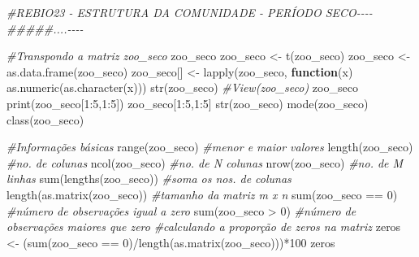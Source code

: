 \documentclass[
  letterpaper,
  DIV=11,
  numbers=noendperiod]{scrartcl}
\newenvironment{Shaded}{}{}
\newcommand{\CommentTok}[1]{\textcolor[rgb]{0.38,0.63,0.69}{\textit{#1}}}
\newcommand{\ControlFlowTok}[1]{\textcolor[rgb]{0.00,0.44,0.13}{\textbf{#1}}}
\newcommand{\DecValTok}[1]{\textcolor[rgb]{0.25,0.63,0.44}{#1}}
\newcommand{\DocumentationTok}[1]{\textcolor[rgb]{0.73,0.13,0.13}{\textit{#1}}}
\newcommand{\FunctionTok}[1]{\textcolor[rgb]{0.02,0.16,0.49}{#1}}
\newcommand{\NormalTok}[1]{#1}
\newcommand{\OtherTok}[1]{\textcolor[rgb]{0.00,0.44,0.13}{#1}}
\newcommand{\SpecialCharTok}[1]{\textcolor[rgb]{0.25,0.44,0.63}{#1}}
\begin{document}
\begin{Shaded}
\begin{Highlighting}[numbers=left,,]
\CommentTok{\#REBIO23 {-} ESTRUTURA DA COMUNIDADE {-} PERÍODO SECO{-}{-}{-}{-}}
\DocumentationTok{\#\#\#\#\#....{-}{-}{-}{-}}

\CommentTok{\#Transpondo a matriz zoo\_seco}
\NormalTok{zoo\_seco}
\NormalTok{zoo\_seco }\OtherTok{\textless{}{-}} \FunctionTok{t}\NormalTok{(zoo\_seco)}
\NormalTok{zoo\_seco }\OtherTok{\textless{}{-}} \FunctionTok{as.data.frame}\NormalTok{(zoo\_seco)}
\NormalTok{zoo\_seco[] }\OtherTok{\textless{}{-}} \FunctionTok{lapply}\NormalTok{(zoo\_seco, }\ControlFlowTok{function}\NormalTok{(x) }\FunctionTok{as.numeric}\NormalTok{(}\FunctionTok{as.character}\NormalTok{(x)))}
\FunctionTok{str}\NormalTok{(zoo\_seco)}
\CommentTok{\#View(zoo\_seco)}
\NormalTok{zoo\_seco}
\FunctionTok{print}\NormalTok{(zoo\_seco[}\DecValTok{1}\SpecialCharTok{:}\DecValTok{5}\NormalTok{,}\DecValTok{1}\SpecialCharTok{:}\DecValTok{5}\NormalTok{])}
\NormalTok{zoo\_seco[}\DecValTok{1}\SpecialCharTok{:}\DecValTok{5}\NormalTok{,}\DecValTok{1}\SpecialCharTok{:}\DecValTok{5}\NormalTok{]}
\FunctionTok{str}\NormalTok{(zoo\_seco)}
\FunctionTok{mode}\NormalTok{(zoo\_seco)}
\FunctionTok{class}\NormalTok{(zoo\_seco)}

\CommentTok{\#Informações básicas}
\FunctionTok{range}\NormalTok{(zoo\_seco) }\CommentTok{\#menor e maior valores}
\FunctionTok{length}\NormalTok{(zoo\_seco) }\CommentTok{\#no. de colunas}
\FunctionTok{ncol}\NormalTok{(zoo\_seco) }\CommentTok{\#no. de N colunas}
\FunctionTok{nrow}\NormalTok{(zoo\_seco) }\CommentTok{\#no. de M linhas}
\FunctionTok{sum}\NormalTok{(}\FunctionTok{lengths}\NormalTok{(zoo\_seco)) }\CommentTok{\#soma os nos. de colunas}
\FunctionTok{length}\NormalTok{(}\FunctionTok{as.matrix}\NormalTok{(zoo\_seco)) }\CommentTok{\#tamanho da matriz m x n}
\FunctionTok{sum}\NormalTok{(zoo\_seco }\SpecialCharTok{==} \DecValTok{0}\NormalTok{) }\CommentTok{\#número de observações igual a zero}
\FunctionTok{sum}\NormalTok{(zoo\_seco }\SpecialCharTok{\textgreater{}} \DecValTok{0}\NormalTok{) }\CommentTok{\#número de observações maiores que zero}
\CommentTok{\#calculando a proporção de zeros na matriz}
\NormalTok{zeros }\OtherTok{\textless{}{-}}\NormalTok{ (}\FunctionTok{sum}\NormalTok{(zoo\_seco }\SpecialCharTok{==} \DecValTok{0}\NormalTok{)}\SpecialCharTok{/}\FunctionTok{length}\NormalTok{(}\FunctionTok{as.matrix}\NormalTok{(zoo\_seco)))}\SpecialCharTok{*}\DecValTok{100}
\NormalTok{zeros}


\end{Highlighting}
\end{Shaded}
\end{document}
